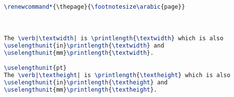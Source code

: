 \begin{tcolorbox}[breakable, size=fbox, boxrule=1pt, pad at break*=1mm,colback=cellbackground, colframe=cellborder]
\begin{lstlisting}[language=TeX,frame=single,framerule=0pt,label=lst:scr1543X0]
% scales page number font size if document is 12pt -> page numbers 10 pt
\renewcommand*{\thepage}{\footnotesize\arabic{page}}



The \verb|\textwidth| is \printlength{\textwidth} which is also
\uselengthunit{in}\printlength{\textwidth} and
\uselengthunit{mm}\printlength{\textwidth}.

\uselengthunit{pt}
The \verb|\textheight| is \printlength{\textheight} which is also
\uselengthunit{in}\printlength{\textheight} and
\uselengthunit{mm}\printlength{\textheight}.


\end{lstlisting}
\end{tcolorbox}
\lstset{style=resetdefaults}




%